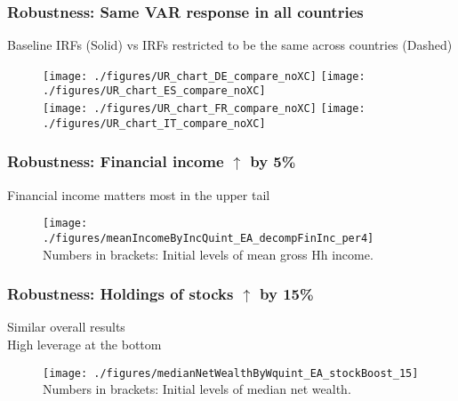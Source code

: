 \documentclass[pdflatex,aspectratio=169]{beamer}
\begin{document}
\begin{frame}\frametitle{\bf Robustness: Same VAR response in all countries \hypertarget{SameXC}{}}
{\scriptsize Baseline IRFs (Solid) vs IRFs restricted to be the same across countries (Dashed) \hyperlink{Robust}{}}

\begin{figure}
\begin{center}
\texttt{[image: ./figures/UR\_chart\_DE\_compare\_noXC]}
\texttt{[image: ./figures/UR\_chart\_ES\_compare\_noXC]}\\
\texttt{[image: ./figures/UR\_chart\_FR\_compare\_noXC]}
\texttt{[image: ./figures/UR\_chart\_IT\_compare\_noXC]}
\end{center}
\end{figure}

\end{frame}


\begin{frame}\frametitle{\bf Robustness: Financial income $\uparrow$ by 5\% \hypertarget{FinInc}{}}
Financial income matters most in the upper tail \hyperlink{Robust}{}
\begin{figure}
\begin{center}
\texttt{[image: ./figures/meanIncomeByIncQuint\_EA\_decompFinInc\_per4]}\\
{\scriptsize Numbers in brackets: Initial levels of mean gross Hh income. }
\end{center}
\end{figure}

\end{frame}


\begin{frame}\frametitle{\bf Robustness: Holdings of stocks $\uparrow$ by 15\% \hypertarget{StockBoost}{}}
Similar overall results \hyperlink{Robust}{}\\
High leverage at the bottom
\begin{figure}
\begin{center}
\texttt{[image: ./figures/medianNetWealthByWquint\_EA\_stockBoost\_15]}\\[-2mm]
{\scriptsize Numbers in brackets: Initial levels of median net wealth. }
\end{center}
\end{figure}

\end{frame}
\end{document}
